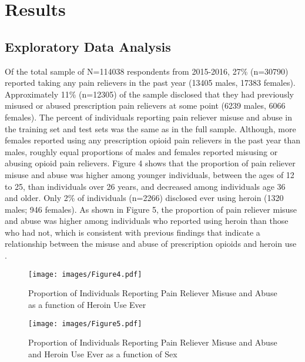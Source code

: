 \documentclass[sigconf]{acmart}
\begin{document}

\section{Results}

\subsection{Exploratory Data Analysis}

Of the total sample of N=114038 respondents from 2015-2016, 27\% (n=30790) 
reported taking any pain relievers in the past year (13405 males, 17383 
females). Approximately 11\% (n=12305) of the sample disclosed that they 
had previously misused or abused prescription pain relievers at some point 
(6239 males, 6066 females). The percent of individuals reporting pain reliever 
misuse and abuse in the training set and test sets was the same as in the 
full sample. Although, more females reported using any prescription opioid 
pain relievers in the past year than males, roughly equal proportions of 
males and females reported misusing or abusing opioid pain relievers. 
Figure 4 shows that the proportion of pain reliever misuse and abuse was 
higher among younger individuals, between the ages of 12 to 25, than 
individuals over 26 years, and decreased among individuals age 36 and older. 
Only 2\% of individuals (n=2266) disclosed ever using heroin (1320 males; 
946 females). As shown in Figure 5, the proportion of pain reliever misuse 
and abuse was higher among individuals who reported using heroin than those 
who had not, which is consistent with previous findings that indicate a 
relationship between the misuse and abuse of prescription opioids and 
heroin use \cite{muhuri13, unick13}.

\begin{figure}[!ht]
  \centering\texttt{[image: images/Figure4.pdf]}
  \caption{Proportion of Individuals Reporting Pain Reliever Misuse and Abuse
  as a function of Heroin Use Ever}
  \label{f:Figure4}
\end{figure}

\begin{figure}[!ht]
  \centering\texttt{[image: images/Figure5.pdf]}
  \caption{Proportion of Individuals Reporting Pain Reliever Misuse and Abuse
  and Heroin Use Ever as a function of Sex}
  \label{f:Figure5}
\end{figure}
 
\end{document}

